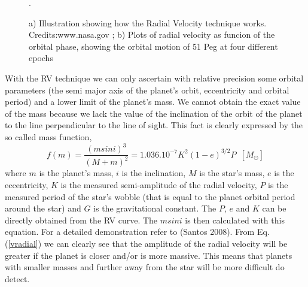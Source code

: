 \documentclass[dvips,12pt,a4paper]{report}
\begin{document}
\begin{figure}[h]
\centering
{}
\caption[The RV Technique]{a) Illustration showing how the Radial Velocity technique works. Credits:www.nasa.gov ; b) Plots of radial velocity as funcion of the orbital phase, showing the orbital motion of 51 Peg at four different epochs \citep{Mayor-1995}}.
\label{rvpic}
\end{figure}

With the RV technique we can only ascertain with relative precision some orbital parameters (the semi major axis of the planet's orbit, eccentricity and orbital period) and a lower limit of the planet's mass. We cannot obtain the exact value of the mass because we lack the value of the inclination of the orbit of the planet to the line perpendicular to the line of sight. This fact is clearly expressed by the so called mass function,
\begin{equation}
 f(m)=\frac{(msini)^3}{(M+m)^2}=1.036.10^{-7}K^2(1-e)^{3/2}P\,\,\, [M_\odot]
\label {vradial}
\end{equation}
where $m$ is the planet's mass, $i$ is the inclination, $M$ is the star's mass, $e$ is the eccentricity, $K$ is the measured semi-amplitude of the radial velocity, $P$ is the measured period of the star's wobble (that is equal to the planet orbital period around the star) and $G$ is the gravitational constant. The $P$, $e$ and $K$ can be directly obtained from the RV curve. The $msini$ is then calculated with this equation. For a detailed demonstration refer to (Santos 2008). From Eq. (\ref{vradial}) we can clearly see that the amplitude of the radial velocity will be greater if the planet is closer and/or is more massive. This means that planets with smaller masses and further away from the star will be more difficult do detect. 
\end{document}
